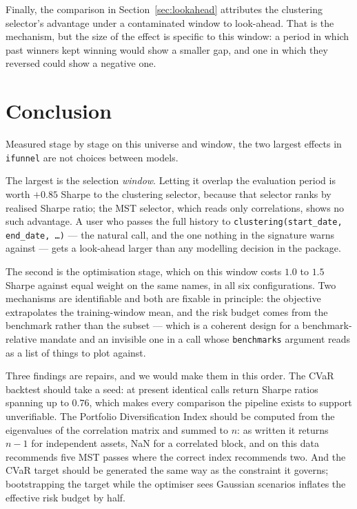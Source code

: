 \documentclass[11pt,a4paper]{article}
\newcommand{\code}[1]{\texttt{#1}}
\begin{document}
Finally, the comparison in Section~\ref{sec:lookahead} attributes the
clustering selector's advantage under a contaminated window to look-ahead. That
is the mechanism, but the size of the effect is specific to this window: a
period in which past winners kept winning would show a smaller gap, and one in
which they reversed could show a negative one.

\section{Conclusion}

Measured stage by stage on this universe and window, the two largest effects in
\code{ifunnel} are not choices between models.

The largest is the selection \emph{window}. Letting it overlap the evaluation
period is worth $+0.85$ Sharpe to the clustering selector, because that selector
ranks by realised Sharpe ratio; the MST selector, which reads only correlations,
shows no such advantage. A user who passes the full history to
\code{clustering(start\_date, end\_date, \ldots)} --- the natural call, and the
one nothing in the signature warns against --- gets a look-ahead larger than any
modelling decision in the package.

The second is the optimisation stage, which on this window costs $1.0$ to $1.5$
Sharpe against equal weight on the same names, in all six configurations. Two
mechanisms are identifiable and both are fixable in principle: the objective
extrapolates the training-window mean, and the risk budget comes from the
benchmark rather than the subset --- which is a coherent design for a
benchmark-relative mandate and an invisible one in a call whose
\code{benchmarks} argument reads as a list of things to plot against.

Three findings are repairs, and we would make them in this order. The CVaR
backtest should take a seed: at present identical calls return Sharpe ratios
spanning up to $0.76$, which makes every comparison the pipeline exists to
support unverifiable. The Portfolio Diversification Index should be computed
from the eigenvalues of the correlation matrix and summed to $n$: as written it
returns $n-1$ for independent assets, NaN for a correlated block, and on this
data recommends five MST passes where the correct index recommends two. And the
CVaR target should be generated the same way as the constraint it governs;
bootstrapping the target while the optimiser sees Gaussian scenarios inflates
the effective risk budget by half.
\end{document}
